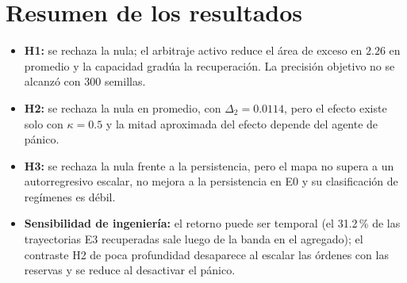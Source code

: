 \section{Resumen de los resultados}

\begin{itemize}
  \item \textbf{H1:} se rechaza la nula; el arbitraje activo reduce el área de exceso en $2.26$ en promedio y la capacidad gradúa la recuperación. La precisión objetivo no se alcanzó con 300 semillas.
  \item \textbf{H2:} se rechaza la nula en promedio, con $\Delta_2=0.0114$, pero el efecto existe solo con $\kappa=0.5$ y la mitad aproximada del efecto depende del agente de pánico.
  \item \textbf{H3:} se rechaza la nula frente a la persistencia, pero el mapa no supera a un autorregresivo escalar, no mejora a la persistencia en E0 y su clasificación de regímenes es débil.
  \item \textbf{Sensibilidad de ingeniería:} el retorno puede ser temporal (el 31.2\,\% de las trayectorias E3 recuperadas sale luego de la banda en el agregado); el contraste H2 de poca profundidad desaparece al escalar las órdenes con las reservas y se reduce al desactivar el pánico.
\end{itemize}
